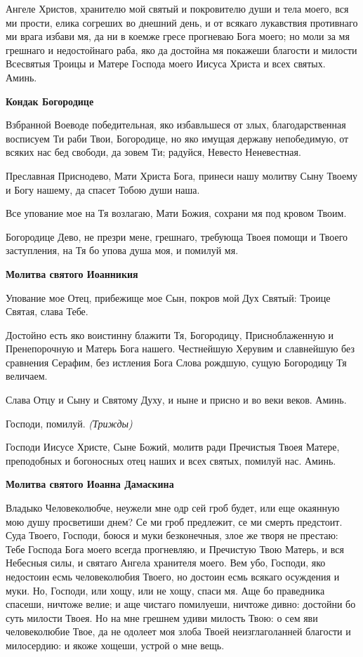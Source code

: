 Ангеле Христов, хранителю мой святый и покровителю души и тела моего, вся ми прости, елика согреших во днешний день, и от всякаго лукавствия противнаго ми врага избави мя, да ни в коемже гресе прогневаю Бога моего; но моли за мя грешнаго и недостойнаго раба, яко да достойна мя покажеши благости и милости Всесвятыя Троицы и Матере Господа моего Иисуса Христа и всех святых. Аминь.


\medskip
\bfseries Кондак Богородице\normalfont{}\nopagebreak


Взбранной Воеводе победительная, яко избавльшеся от злых, благодарственная восписуем Ти раби Твои, Богородице, но яко имущая державу непобедимую, от всяких нас бед свободи, да зовем Ти; радуйся, Невесто Неневестная.


Преславная Приснодево, Мати Христа Бога, принеси нашу молитву Сыну Твоему и Богу нашему, да спасет Тобою души наша.


Все упование мое на Тя возлагаю, Мати Божия, сохрани мя под кровом Твоим.


Богородице Дево, не презри мене, грешнаго, требующа Твоея помощи и Твоего заступления, на Тя бо упова душа моя, и помилуй мя.


\medskip
\bfseries Молитва святого Иоанникия\normalfont{}\nopagebreak


Упование мое Отец, прибежище мое Сын, покров мой Дух Святый: Троице Святая, слава Тебе.


Достойно есть яко воистинну блажити Тя, Богородицу, Присноблаженную и Пренепорочную и Матерь Бога нашего. Честнейшую Херувим и славнейшую без сравнения Серафим, без истления Бога Слова рождшую, сущую Богородицу Тя величаем.


Слава Отцу и Сыну и Святому Духу, и ныне и присно и во веки веков. Аминь.

 
Господи, помилуй. \itshape (Трижды)\normalfont{}


Господи Иисусе Христе, Сыне Божий, молитв ради Пречистыя Твоея Матере, преподобных и богоносных отец наших и всех святых, помилуй нас. Аминь.


\medskip
\bfseries Молитва святого Иоанна Дамаскина\normalfont{}\nopagebreak


Владыко Человеколюбче, неужели мне одр сей гроб будет, или еще окаянную мою душу просветиши днем? Се ми гроб предлежит, се ми смерть предстоит. Суда Твоего, Господи, боюся и муки безконечныя, злое же творя не престаю: Тебе Господа Бога моего всегда прогневляю, и Пречистую Твою Матерь, и вся Небесныя силы, и святаго Ангела хранителя моего. Вем убо, Господи, яко недостоин есмь человеколюбия Твоего, но достоин есмь всякаго осуждения и муки. Но, Господи, или хощу, или не хощу, спаси мя. Аще бо праведника спасеши, ничтоже велие; и аще чистаго помилуеши, ничтоже дивно: достойни бо суть милости Твоея. Но на мне грешнем удиви милость Твою: о сем яви человеколюбие Твое, да не одолеет моя злоба Твоей неизглаголанней благости и милосердию: и якоже хощеши, устрой о мне вещь.


